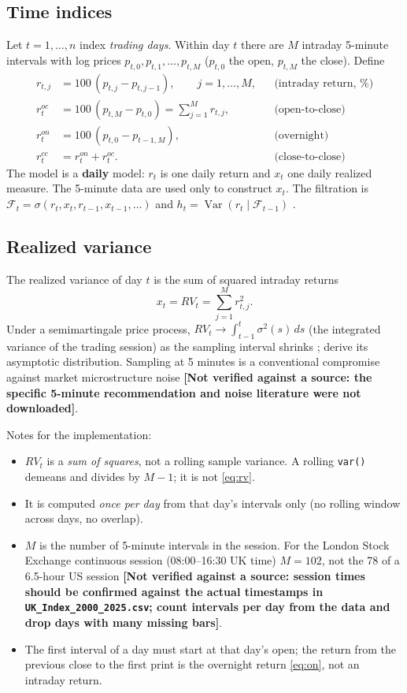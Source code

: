 \documentclass[11pt]{article}
\newcommand{\F}{\mathcal{F}}
\newcommand{\Var}{\operatorname{Var}}
\newcommand{\unverified}[1]{\textbf{[Not verified against a source: #1]}}
\begin{document}
\subsection{Time indices}
Let $t=1,\dots,n$ index \emph{trading days}. Within day $t$ there are $M$ intraday
5-minute intervals with log prices $p_{t,0},p_{t,1},\dots,p_{t,M}$ ($p_{t,0}$ the open,
$p_{t,M}$ the close). Define
\begin{align}
r_{t,j} &= 100\,(p_{t,j}-p_{t,j-1}), \qquad j=1,\dots,M, && \text{(intraday return, \%)} \label{eq:intraday}\\
r^{oc}_t &= 100\,(p_{t,M}-p_{t,0}) = \textstyle\sum_{j=1}^M r_{t,j}, && \text{(open-to-close)} \label{eq:oc}\\
r^{on}_t &= 100\,(p_{t,0}-p_{t-1,M}), && \text{(overnight)} \label{eq:on}\\
r^{cc}_t &= r^{on}_t + r^{oc}_t. && \text{(close-to-close)} \label{eq:cc}
\end{align}
The model is a \textbf{daily} model: $r_t$ is one daily return and $x_t$ one daily realized
measure. The 5-minute data are used only to construct $x_t$. The filtration is
$\F_t=\sigma(r_t,x_t,r_{t-1},x_{t-1},\dots)$ and $h_t=\Var(r_t\mid\F_{t-1})$ \cite{HHS2012}.

\subsection{Realized variance}
The realized variance of day $t$ is the sum of squared intraday returns
\begin{equation}\label{eq:rv}
x_t = RV_t = \sum_{j=1}^{M} r_{t,j}^2 .
\end{equation}
Under a semimartingale price process, $RV_t\to\int_{t-1}^{t}\sigma^2(s)\,ds$ (the integrated
variance of the trading session) as the sampling interval shrinks
\cite{BNS2002,ABDL2003}; \cite{BNS2002} derive its asymptotic distribution.
Sampling at 5 minutes is a conventional compromise against market microstructure noise
\unverified{the specific 5-minute recommendation and noise literature were not downloaded}.

Notes for the implementation:
\begin{itemize}
\item $RV_t$ is a \emph{sum of squares}, not a rolling sample variance. A rolling
  \texttt{var()} demeans and divides by $M-1$; it is not \eqref{eq:rv}.
\item It is computed \emph{once per day} from that day's intervals only (no rolling window
  across days, no overlap).
\item $M$ is the number of 5-minute intervals in the session. For the London Stock
  Exchange continuous session (08:00--16:30 UK time) $M=102$, not the 78 of a 6.5-hour US
  session \unverified{session times should be confirmed against the actual timestamps in
  \texttt{UK\_Index\_2000\_2025.csv}; count intervals per day from the data and drop days
  with many missing bars}.
\item The first interval of a day must start at that day's open; the return from the previous
  close to the first print is the overnight return \eqref{eq:on}, not an intraday return.
\end{itemize}
\end{document}
